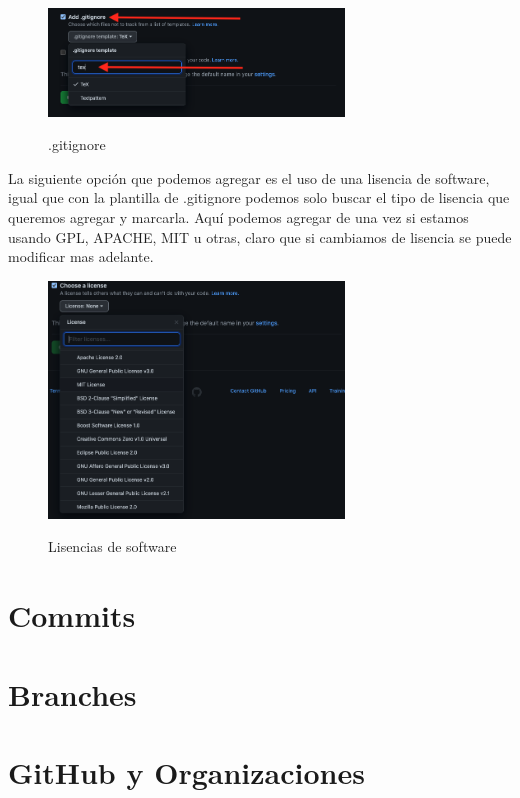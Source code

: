 \documentclass[11pt, oneside]{article}
\begin{document}
\begin{figure}[H]
  \centering
  \caption{.gitignore}
  \includegraphics[width=0.70\textwidth]{./img/github-new-repo-4.png}
  \label{fig:github-new-repo-4}
\end{figure}

La siguiente opción que podemos agregar es el uso de una lisencia de software, igual que con la plantilla de .gitignore podemos solo buscar el tipo de lisencia que queremos agregar y marcarla. Aquí podemos agregar de una vez si estamos usando GPL, APACHE, MIT u otras, claro que si cambiamos de lisencia se puede modificar mas adelante.

\begin{figure}[H]
  \centering
  \caption{Lisencias de software}
  \includegraphics[width=0.70\textwidth]{./img/github-new-repo-5.png}
  \label{fig:github-new-repo-5}
\end{figure}

\section{Commits}

\section{Branches}

\section{GitHub y Organizaciones}
\end{document}
